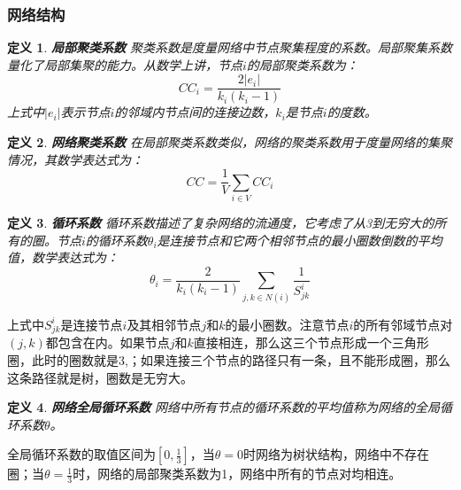 \documentclass{ctexart}
\newtheorem{Definition}{\hspace{2em}定义}[section]
\begin{document}
            \subsubsection{网络结构}
                \begin{Definition}
                    \textbf{局部聚类系数} 聚类系数是度量网络中节点聚集程度的系数。局部聚集系数量化了局部集聚的能力。从数学上讲，节点$i$的局部聚类系数为：
                    $$
                        CC_i = \frac{2|e_i|}{k_i(k_i-1)}
                    $$
                    上式中$|e_i|$表示节点$i$的邻域内节点间的连接边数，$k_i$是节点$i$的度数。
                \end{Definition}
                \begin{Definition}
                    \textbf{网络聚类系数} 在局部聚类系数类似，网络的聚类系数用于度量网络的集聚情况，其数学表达式为：
                    $$
                        CC = \frac{1}{V}\sum_{i\in V} CC_i
                    $$
                \end{Definition}
                \begin{Definition}
                    \textbf{循环系数} 循环系数描述了复杂网络的流通度，它考虑了从3到无穷大的所有的圈。节点$i$的循环系数$\theta_i$是连接节点和它两个相邻节点的最小圈数倒数的平均值，数学表达式为：
                    $$
                        \theta_i = \frac{2}{k_i(k_i-1)}\sum_{j,k\in N(i)}\frac{1}{S_{jk}^i}
                    $$
                \end{Definition}
                上式中$S_{jk}^i$是连接节点$i$及其相邻节点$j$和$k$的最小圈数。注意节点$i$的所有邻域节点对$(j,k)$都包含在内。如果节点$j$和$k$直接相连，那么这三个节点形成一个三角形圈，此时的圈数就是3,；如果连接三个节点的路径只有一条，且不能形成圈，那么这条路径就是树，圈数是无穷大。

                \begin{Definition}
                    \textbf{网络全局循环系数} 网络中所有节点的循环系数的平均值称为网络的全局循环系数$\theta$。
                \end{Definition}
                全局循环系数的取值区间为$[0,\frac{1}{3}]$，当$\theta=0$时网络为树状结构，网络中不存在圈；当$\theta=\frac{1}{3}$时，网络的局部聚类系数为1，网络中所有的节点对均相连。
\end{document}
